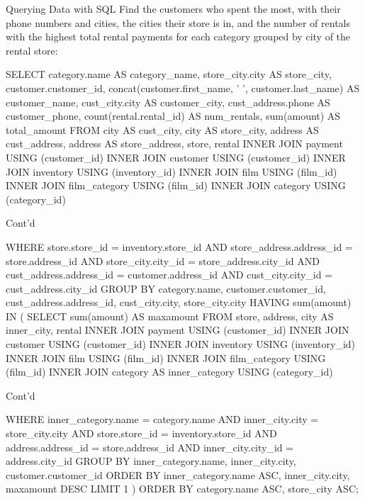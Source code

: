 \documentclass[ignorenonframetext,xcolor=x11names]{beamer}
\begin{document}
\begin{frame}[fragile]{Querying Data with SQL}
Find the customers who spent the most, with their phone numbers and cities, the cities their store is in, and the number of rentals with the highest total rental payments for each category grouped by city of the rental store:
\scriptsize
\begin{sqlcode}
SELECT category.name AS category_name, 
       store_city.city AS store_city,
       customer.customer_id, 
       concat(customer.first_name, ' ', 
          customer.last_name) AS customer_name,
       cust_city.city AS customer_city,
       cust_address.phone AS customer_phone,
       count(rental.rental_id) AS num_rentals,
       sum(amount) AS total_amount
 FROM city AS cust_city, city AS store_city, 
      address AS cust_address, address AS store_address, 
      store, rental
 INNER JOIN payment USING (customer_id)
 INNER JOIN customer USING (customer_id)
 INNER JOIN inventory USING (inventory_id)
 INNER JOIN film USING (film_id)
 INNER JOIN film_category USING (film_id)
 INNER JOIN category USING (category_id)
\end{sqlcode}
\end{frame}
\begin{frame}[fragile]{Cont'd}
\scriptsize
\begin{sqlcode}
 WHERE store.store_id = inventory.store_id
   AND store_address.address_id = store.address_id
   AND store_city.city_id = store_address.city_id
   AND cust_address.address_id = customer.address_id
   AND cust_city.city_id = cust_address.city_id
 GROUP BY category.name, customer.customer_id, 
         cust_address.address_id, cust_city.city, 
         store_city.city
 HAVING sum(amount) IN (
  SELECT sum(amount) AS maxamount
   FROM store, address, city AS inner_city, rental
   INNER JOIN payment USING (customer_id)
   INNER JOIN customer USING (customer_id)
   INNER JOIN inventory USING (inventory_id)
   INNER JOIN film USING (film_id)
   INNER JOIN film_category USING (film_id)
   INNER JOIN category AS inner_category USING (category_id)
\end{sqlcode}
\end{frame}
\begin{frame}[fragile]{Cont'd}
\scriptsize
\begin{sqlcode}
   WHERE inner_category.name = category.name AND
         inner_city.city = store_city.city AND
         store.store_id = inventory.store_id AND
         address.address_id = store.address_id AND
         inner_city.city_id = address.city_id
   GROUP BY inner_category.name, 
            inner_city.city, 
            customer.customer_id
   ORDER BY inner_category.name ASC, 
            inner_city.city, 
            maxamount DESC
   LIMIT 1 )
 ORDER BY category.name ASC, store_city ASC;
\end{sqlcode}
\end{frame}
\end{document}
